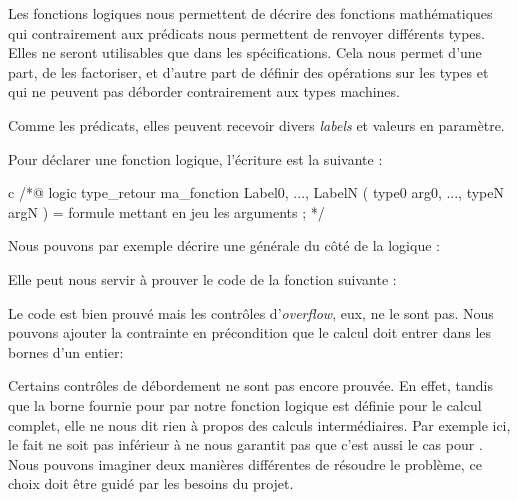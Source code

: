 Les fonctions logiques nous permettent de décrire des fonctions mathématiques
qui contrairement aux prédicats nous permettent de renvoyer différents types.
Elles ne seront utilisables que dans les spécifications. Cela nous permet d'une
part, de les factoriser, et d'autre part de définir des opérations sur les
types  et  qui ne peuvent pas déborder
contrairement aux types machines.



Comme les prédicats, elles peuvent recevoir divers \textit{labels} et valeurs en
paramètre.





Pour déclarer une fonction logique, l'écriture est la suivante :



\begin{CodeBlock}{c}
/*@
  logic type_retour ma_fonction{ Label0, ..., LabelN }( type0 arg0, ..., typeN argN ) =
    formule mettant en jeu les arguments ;
*/
\end{CodeBlock}



Nous pouvons par exemple décrire une  générale du côté de la logique :






Elle peut nous servir à prouver le code de la fonction suivante :








Le code est bien prouvé mais les contrôles d'\textit{overflow}, eux, ne le sont pas.
Nous pouvons ajouter la contrainte en précondition que le calcul doit entrer dans
les bornes d'un entier:




Certains contrôles de débordement ne sont pas encore prouvée. En effet, tandis que
la borne fournie pour  par notre fonction logique est définie pour
le calcul complet, elle ne nous dit rien à propos des calculs intermédiaires. Par
exemple ici, le fait  ne soit pas inférieur à
 ne nous garantit pas que c'est aussi le cas pour
. Nous pouvons imaginer deux manières différentes de résoudre
le problème, ce choix doit être guidé par les besoins du projet.


